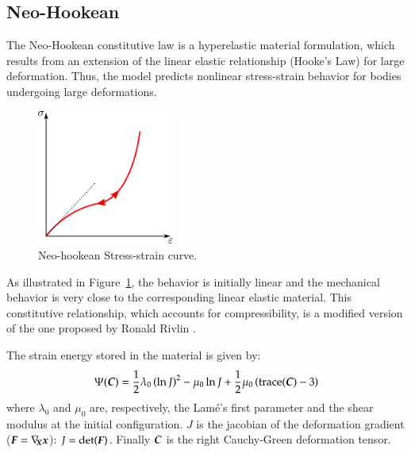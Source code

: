 
\subsection{Neo-Hookean}

The Neo-Hookean constitutive law is a hyperelastic material formulation, which
results from an extension of the linear elastic relationship (Hooke's Law) for
large deformation. Thus, the model predicts nonlinear stress-strain behavior for
bodies undergoing large deformations.

\begin{figure}[!htb]
  \begin{center}
    \includegraphics[width=0.4\textwidth,keepaspectratio=true]{figures/stress_strain_neo.pdf}
    \caption{Neo-hookean Stress-strain curve.}
    \label{fig:smm:cl:neo_hookean}
  \end{center}
\end{figure}

As illustrated in Figure~\ref{fig:smm:cl:neo_hookean}, the behavior is initially
linear and the mechanical behavior is very close to the corresponding linear
elastic material. This constitutive relationship, which accounts for compressibility,
 is a modified version of the one proposed by Ronald Rivlin \cite{Belytschko:2000}.

The strain energy stored in the material is given by:
\begin{equation}\label{eqn:smm:constitutive:neohookean_potential}
  \Psi(\boldsymbol{C}) = \frac{1}{2}\lambda_0\left(\ln J\right)^2-\mu_0\ln J+\frac{1}{2}
\mu_0\left(\text{trace}(\boldsymbol{C})-3\right)
\end{equation}
\noindent where $\lambda_0$ and $\mu_0$ are, respectively, the Lam\'e's first parameter
and the shear modulus at the initial configuration. $J$ is the jacobian of the deformation
gradient ($\boldsymbol{F}=\nabla_{\!\!\boldsymbol{X}}\boldsymbol{x}$): $J=\text{det}(\boldsymbol{F})$. Finally $\boldsymbol{C}$ is the right Cauchy-Green
deformation tensor.

